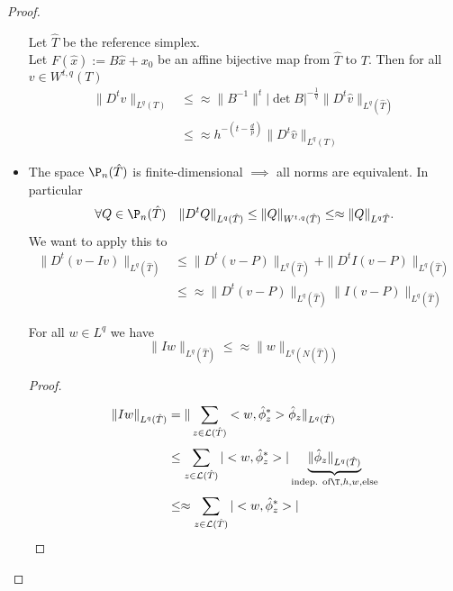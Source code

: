 \begin{proof}
\begin{itemize}
\begin{equation*}
			\end{equation*}
			Let $\hat{T}$ be the reference simplex.\\
			Let $F(\hat{x}):= B\hat{x} + x_{0}$ be an affine bijective map from $\hat{T}$ to $T$.
			Then for all $v \in W^{t,q}(T)$ 
			\begin{align*}
				\|D^tv\|_{L^{q}(T)} &\leq \approx \|B^{-1} \|^{t} |\det B|^{-\frac{1}{q}} \|D^t \hat{v}\|_{L^{q}(\hat{T})}\\
									&\leq \approx h^{-(t-\frac{d}{p})} \|D^t \hat{v}\|_{L^{q}(T)}
			\end{align*}
		\item The space $\P_{n}(\hat{T})$ is finite-dimensional $\implies$ all norms are equivalent. In particular 
			\begin{equation*}
				\forall Q \in \P_{n}(\hat{T}) \quad \|D^t Q\|_{L^{q}(\hat{T})} \leq \|Q\|_{W^{t,q}(\hat{T})} \leq\approx \|Q\|_{L^{q}\hat{T}}. 
			\end{equation*}
			We want to apply this to 
			\begin{align*}
				\|D^t(v-Iv)\|_{L^{q}(\hat{T})} &\leq \|D^t(v-P)\|_{L^{q}(\hat{T})} + \|D^tI(v-P)\|_{L^{q}(\hat{T})}\\
											   &\leq\approx \|D^t(v-P)\|_{L^{q}(\hat{T})} \|I(v-P)\|_{L^{q}(\hat{T})}
			\end{align*}
		\begin{lemma}
			For all $w\in L^q$ we have 
			\begin{equation*}
				\|Iw\|_{L^{q}(\hat{T})} \leq \approx \|w\|_{L^{q}(N(\hat{T}))}
			\end{equation*}
		\end{lemma}
		\begin{proof}
			\begin{align*}
				\|Iw\|_{L^{q}(\hat{T})} &= \|\sum\limits_{z \in\mathcal{L}(\hat{T})}^{} <w,\hat{\phi}_{z}^*>\hat{\phi}_{z}\|_{L^{q}(\hat{T})}\\
										&\leq \sum\limits_{z \in\mathcal{L}(\hat{T})}^{} |<w,\hat{\phi}_{z}^*>| \underbrace{\|\hat{\phi}_{z}\|_{L^{q}(\hat{T})}}_{\text{indep. of} \T,h,w,\text{else}}\\
										&\leq\approx \sum\limits_{z \in\mathcal{L}(\hat{T})}^{} |<w,\hat{\phi}_{z}^*>|\\


\end{align*}
\end{proof}
\end{itemize}
\end{proof}
